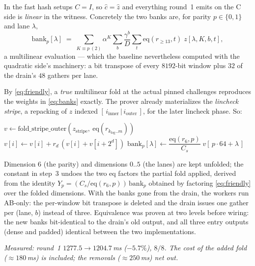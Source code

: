 \documentclass[11pt]{article}
\newcommand{\eq}{\mathrm{eq}}
\begin{document}
In the fast hash setups $C=I$, so $\hat c = \hat z$ and everything round~1
emits on the C side is \emph{linear} in the witness. Concretely the two banks
are, for parity $p\in\{0,1\}$ and lane $\lambda$,
\begin{equation}
\mathrm{bank}_p[\lambda] \;=\;
\sum_{K\equiv p\ (2)} \alpha^{K}
\sum_{b} \frac{\gamma^{b}}{D}
\sum_{t} \eq(r_{\ge13}, t)\; z[\lambda,K,b,t],
\label{eq:banks}
\end{equation}
a multilinear evaluation --- which the baseline nevertheless computed with the
quadratic side's machinery: a bit transpose of every $8192$-bit window plus
$32$ of the drain's $48$ gathers per lane.

By \eqref{eq:friendly}, a \emph{true} multilinear fold at the actual pinned
challenges reproduces the weights in \eqref{eq:banks} exactly. The prover
already materializes the \emph{lincheck stripe}, a repacking of $z$ indexed
$[\,i_{\mathrm{inner}}\,|\,i_{\mathrm{outer}}\,]$, for the later lincheck
phase. So:

\begin{algorithmic}[1]
\State $v \gets \mathrm{fold\_stripe\_outer}(z_{\mathrm{stripe}},\
  \eq(r_{k_{\log}..m}))$
  \State $v[i] \gets v[i] + r_d\,(v[i]+v[i+2^{d}])$
\EndFor
\State $\mathrm{bank}_p[\lambda] \gets \dfrac{\eq(r_6,p)}{C_s}\;
       v[\,p\cdot64+\lambda\,]$
\end{algorithmic}

\noindent
Dimension 6 (the parity) and dimensions $0..5$ (the lanes) are kept unfolded;
the constant in step~3 undoes the two eq factors the partial fold applied,
derived from the identity $Y_p = (C_s/\eq(r_6,p))\,\mathrm{bank}_p$ obtained
by factoring \eqref{eq:friendly} over the folded dimensions. With the banks
gone from the drain, the workers run AB-only: the per-window bit transpose is
deleted and the drain issues one gather per (lane, $b$) instead of three.
Equivalence was proven at two levels before wiring: the new banks
bit-identical to the drain's old output, and all three entry outputs
(dense and padded) identical between the two implementations.

\emph{Measured: round~1 $1277.5\to1204.7\,$ms ($-5.7\%$), $8/8$. The cost of
the added fold ($\approx180\,$ms) is included; the removals
($\approx250\,$ms) net out.}
\end{document}
